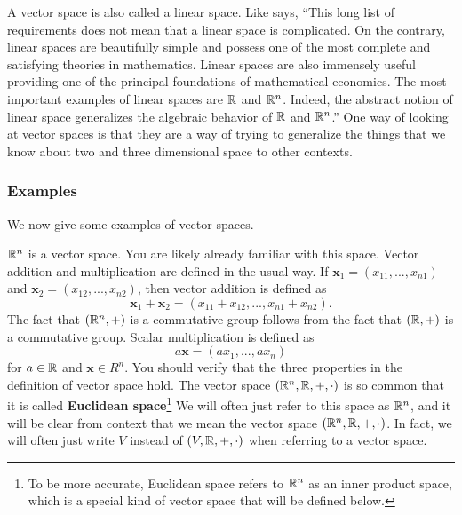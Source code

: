 A vector space is also called a linear space. Like \citet{carter2001}
says, ``This long list of requirements does not mean that a linear
space is complicated. On the contrary, linear spaces are beautifully
simple and possess one of the most complete and satisfying theories in
mathematics.  Linear spaces are also immensely useful providing one of
the principal foundations of mathematical economics. The most
important examples of linear spaces are $\mathbb{R}$ and $\mathbb{R}^n$. Indeed, the
abstract notion of linear space generalizes the algebraic behavior of
$\mathbb{R}$ and $\mathbb{R}^n$.''
One way of looking at vector spaces is that they are a way of trying
to generalize the things that we know about two and three dimensional
space to other contexts. 

\subsubsection{Examples}
We now give some examples of vector spaces. 
\begin{example} \label{ex:Rn}
  $\mathbb{R}^n$ is a vector space. You are likely already
  familiar with this space. Vector addition and multiplication are
  defined in the usual way. If $\mathbf{x}_1 = (x_{11}, ..., x_{n1})$
  and $\mathbf{x}_2 = (x_{12}, ..., x_{n2})$, then vector addition is
  defined as
  \[ \mathbf{x}_1 + \mathbf{x}_2 = (x_{11}+x_{12}, ... , x_{n1} +
  x_{n2}). \]
  The fact that $(\mathbb{R}^n,+)$ is a commutative group follows from the
  fact that $(\mathbb{R},+)$ is a commutative group. Scalar multiplication is
  defined as
  \[ a \mathbf{x} = (a x_1, ..., ax_n) \] for $a \in \mathbb{R}$ and
  $\mathbf{x} \in R^n$. You should verify that the three properties in
  the definition of vector space hold.  The vector space $(\mathbb{R}^n, \mathbb{R},
  +, \cdot)$ is so common that it is called \textbf{Euclidean
    space}\footnote{To be more accurate, Euclidean space refers to
    $\mathbb{R}^n$ as an inner product space, which is a special kind of
    vector space that will be defined below.} We will often just refer
  to this space as $\mathbb{R}^n$, and it will be clear from context that we
  mean the vector space $(\mathbb{R}^n, \mathbb{R}, + , \cdot)$. In fact, we will
  often just write $V$ instead of $(V,\mathbb{R},+,\cdot)$ when referring to a
  vector space.
\end{example}

